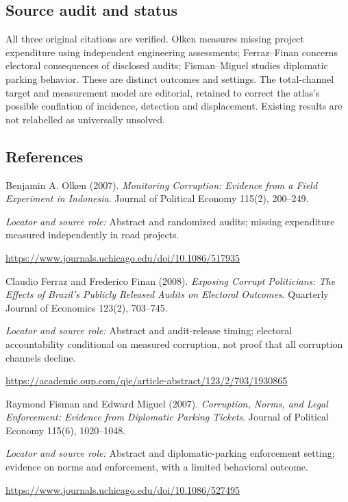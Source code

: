 \documentclass[11pt,a4paper]{article}
\begin{document}
\subsection*{Source audit and status}
All three original citations are verified. Olken measures missing project expenditure using independent engineering assessments; Ferraz--Finan concerns electoral consequences of disclosed audits; Fisman--Miguel studies diplomatic parking behavior. These are distinct outcomes and settings. The total-channel target and measurement model are editorial, retained to correct the atlas's possible conflation of incidence, detection and displacement. Existing results are not relabelled as universally unsolved.
\subsection*{References}
{\footnotesize\raggedright
\begin{enumerate}[label={\textbf{[S\arabic*]}},leftmargin=3em]
\item Benjamin A. Olken (2007). \emph{Monitoring Corruption: Evidence from a Field Experiment in Indonesia}. Journal of Political Economy 115(2), 200--249.\par
\textit{Locator and source role:} Abstract and randomized audits; missing expenditure measured independently in road projects.\par
\url{https://www.journals.uchicago.edu/doi/10.1086/517935}
\item Claudio Ferraz and Frederico Finan (2008). \emph{Exposing Corrupt Politicians: The Effects of Brazil's Publicly Released Audits on Electoral Outcomes}. Quarterly Journal of Economics 123(2), 703--745.\par
\textit{Locator and source role:} Abstract and audit-release timing; electoral accountability conditional on measured corruption, not proof that all corruption channels decline.\par
\url{https://academic.oup.com/qje/article-abstract/123/2/703/1930865}
\item Raymond Fisman and Edward Miguel (2007). \emph{Corruption, Norms, and Legal Enforcement: Evidence from Diplomatic Parking Tickets}. Journal of Political Economy 115(6), 1020--1048.\par
\textit{Locator and source role:} Abstract and diplomatic-parking enforcement setting; evidence on norms and enforcement, with a limited behavioral outcome.\par
\url{https://www.journals.uchicago.edu/doi/10.1086/527495}
\end{enumerate}
}
\end{document}
